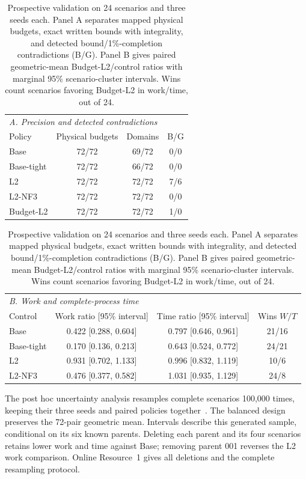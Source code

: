 \begin{table}[htbp]
\centering\small\setlength{\tabcolsep}{5pt}
\caption{Prospective validation on 24 scenarios and three seeds each.
Panel A separates mapped physical budgets, exact written bounds with integrality,
and detected bound/1\%-completion contradictions (B/G). Panel B gives paired
geometric-mean Budget-L2/control ratios with marginal 95\% scenario-cluster
intervals. Wins count scenarios favoring Budget-L2 in work/time, out of 24.}
\label{tab:orf-prospective-main}
\begin{tabular}{lccc}\toprule
\multicolumn{4}{l}{\textit{A. Precision and detected contradictions}}\\[3pt]
Policy & Physical budgets & Domains & B/G\\\midrule
Base & 72/72 & 69/72 & 0/0\\
Base-tight & 72/72 & 66/72 & 0/0\\
L2 & 72/72 & 72/72 & 7/6\\
L2-NF3 & 72/72 & 72/72 & 0/0\\
Budget-L2 & 72/72 & 72/72 & 1/0\\
\bottomrule\end{tabular}

\medskip
\begin{tabular}{lccc}\toprule
\multicolumn{4}{l}{\textit{B. Work and complete-process time}}\\[3pt]
Control & Work ratio [95\% interval] & Time ratio [95\% interval] & Wins $W/T$\\\midrule
Base & 0.422 [0.288, 0.604] & 0.797 [0.646, 0.961] & 21/16\\
Base-tight & 0.170 [0.136, 0.213] & 0.643 [0.524, 0.772] & 24/21\\
L2 & 0.931 [0.702, 1.133] & 0.996 [0.832, 1.119] & 10/6\\
L2-NF3 & 0.476 [0.377, 0.582] & 1.031 [0.935, 1.129] & 24/8\\
\bottomrule\end{tabular}\end{table}

The post hoc uncertainty analysis resamples complete scenarios 100,000 times,
keeping their three seeds and paired policies together~\citep{FieldWelsh2007}.
The balanced design preserves the 72-pair geometric mean. Intervals describe
this generated sample, conditional on its six known parents. Deleting each
parent and its four scenarios retains lower work and time against Base;
removing parent 001 reverses the L2 work comparison. Online Resource~1 gives
all deletions and the complete resampling protocol.

